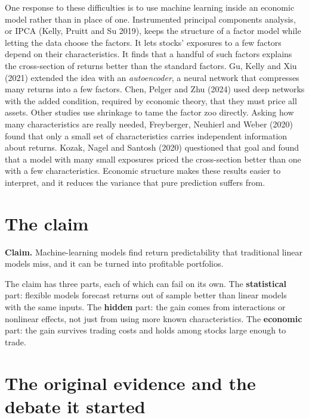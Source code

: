 One response to these difficulties is to use machine learning inside an economic model rather than in place of one. Instrumented principal components analysis, or IPCA (Kelly, Pruitt and Su 2019), keeps the structure of a factor model while letting the data choose the factors. It lets stocks' exposures to a few factors depend on their characteristics. It finds that a handful of such factors explains the cross-section of returns better than the standard factors. Gu, Kelly and Xiu (2021) extended the idea with an \emph{autoencoder}, a neural network that compresses many returns into a few factors. Chen, Pelger and Zhu (2024) used deep networks with the added condition, required by economic theory, that they must price all assets. Other studies use shrinkage to tame the factor zoo directly. Asking how many characteristics are really needed, Freyberger, Neuhierl and Weber (2020) found that only a small set of characteristics carries independent information about returns. Kozak, Nagel and Santosh (2020) questioned that goal and found that a model with many small exposures priced the cross-section better than one with a few characteristics. Economic structure makes these results easier to interpret, and it reduces the variance that pure prediction suffers from.

\section{The claim}
\label{sec:20-claim}

\begin{callout}
\textbf{Claim.} Machine-learning models find return predictability that traditional linear models miss, and it can be turned into profitable portfolios.
\end{callout}

The claim has three parts, each of which can fail on its own. The \textbf{statistical} part: flexible models forecast returns out of sample better than linear models with the same inputs. The \textbf{hidden} part: the gain comes from interactions or nonlinear effects, not just from using more known characteristics. The \textbf{economic} part: the gain survives trading costs and holds among stocks large enough to trade.

\section{The original evidence and the debate it started}
\label{sec:20-evidence}

